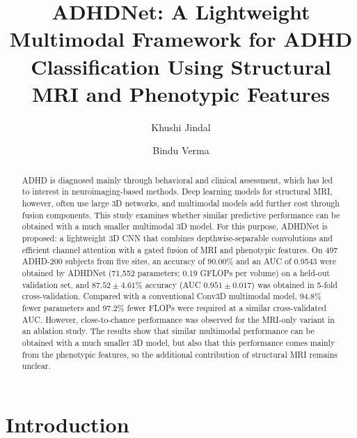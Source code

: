 \documentclass[runningheads]{llncs}
\begin{document}
\title{ADHDNet: A Lightweight Multimodal Framework for ADHD Classification Using Structural MRI and Phenotypic Features}

\author{Khushi Jindal \and Bindu Verma}

\maketitle

\begin{abstract}
ADHD is diagnosed mainly through behavioral and clinical assessment, which has led to interest in neuroimaging-based methods. Deep learning models for structural MRI, however, often use large 3D networks, and multimodal models add further cost through fusion components. This study examines whether similar predictive performance can be obtained with a much smaller multimodal 3D model. For this purpose, ADHDNet is proposed: a lightweight 3D CNN that combines depthwise-separable convolutions and efficient channel attention with a gated fusion of MRI and phenotypic features. On 497 ADHD-200 subjects from five sites, an accuracy of 90.00\% and an AUC of 0.9543 were obtained by ADHDNet (71,552 parameters; 0.19 GFLOPs per volume) on a held-out validation set, and $87.52\pm4.61\%$ accuracy (AUC $0.951\pm0.017$) was obtained in 5-fold cross-validation. Compared with a conventional Conv3D multimodal model, 94.8\% fewer parameters and 97.2\% fewer FLOPs were required at a similar cross-validated AUC. However, close-to-chance performance was observed for the MRI-only variant in an ablation study. The results show that similar multimodal performance can be obtained with a much smaller 3D model, but also that this performance comes mainly from the phenotypic features, so the additional contribution of structural MRI remains unclear.

\end{abstract}

\section{Introduction}
\end{document}
